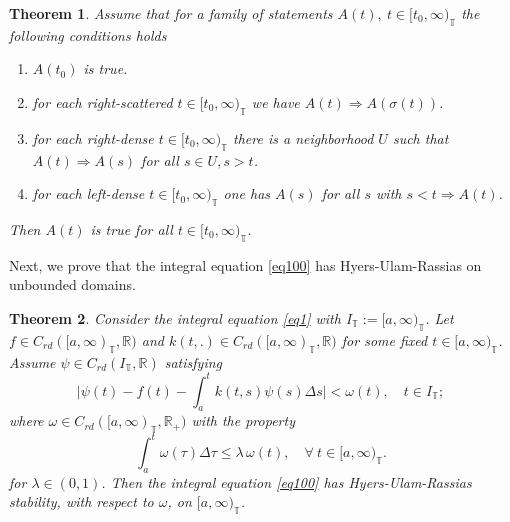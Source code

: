 \documentclass{article}
\newtheorem{thm}{Theorem}
\newcommand{\q}{\quad}
\begin{document}

\begin{thm}
Assume that for a family of statements $A(t), \ t\in [t_0,\infty)_\mathbb{T}$ the following conditions holds
\begin{enumerate}
  \item $A(t_0)$ is true.
  \item for each right-scattered $t\in [t_0,\infty)_\mathbb{T}$ we have $A(t)\Rightarrow A(\sigma(t))$.
  \item for each right-dense $t\in [t_0,\infty)_\mathbb{T}$ there is a neighborhood $U$ such that $A(t)\Rightarrow A(s)$ for all $s\in U, s>t$.
  \item for each left-dense $t\in [t_0,\infty)_\mathbb{T}$ one has $A(s)$ for all $s$ with $s<t\Rightarrow A(t)$.
\end{enumerate}
Then $A(t)$ is true for all $t\in[t_0,\infty)_\mathbb{T}$.
\end{thm}
Next, we prove that the integral equation \eqref{eq100} has Hyers-Ulam-Rassias on unbounded domains.
\begin{thm}
Consider the integral equation \eqref{eq1} with $I_\mathbb{T}:=[a,\infty)_\mathbb{T}$. Let $f\in C_{rd}([a,\infty)_\mathbb{T}, \mathbb{R})$ and $k(t,.)\in C_{rd}([a,\infty)_\mathbb{T}, \mathbb{R})$ for some fixed $t\in [a,\infty)_\mathbb{T}$. Assume $\psi\in C_{rd}(I_\mathbb{T},\mathbb{R})$ satisfying
\begin{equation}\label{eee}
\Big|\psi(t)-f(t)-\int_a^tk(t,s)\psi(s)\Delta s\Big|<\omega(t), \q  t \in I_\mathbb{T};
\end{equation}
where $\omega\in C_{rd}([a,\infty)_\mathbb{T},\mathbb{R}_+)$ with the property
\begin{equation}\label{cond}
  \int_a^t\omega (\tau)\Delta \tau \leq \lambda\,\omega(t), \q \forall \ t \in [a,\infty)_\mathbb{T}.
\end{equation}
for $\lambda\in(0,1)$. Then the integral equation \eqref{eq100} has Hyers-Ulam-Rassias stability, with respect to $\omega$, on $[a,\infty)_\mathbb{T}$.
\end{thm}
\end{document}
